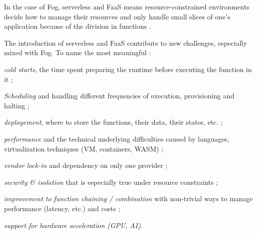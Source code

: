 \documentclass[11pt]{sdm}
\begin{document}
In the case of Fog, serverless and \gls{FaaS} means resource-constrained environments decide how to manage their resources and only handle small slices of one's application because of the division in functions \cite{bermbach_auctionwhisk_2021}.

The introduction of serverless and \gls{FaaS} contribute to new challenges, especially mixed with Fog. To name the most meaningful \cite{kjorveziroski_iot_2021}:
\begin{enumerate*}
	\item \emph{cold starts}, the time spent preparing the runtime before executing the function in it ;
	\item \emph{Scheduling} and handling different frequencies of execution, provisioning and halting ;
	\item \emph{deployement}, where to store the functions, their data, their states, etc. ;
	\item \emph{performance} and the technical underlying difficulties caused by languages, virtualization techniques (\gls{VM}, containers, WASM) ;
	\item \emph{vendor lock-in} and dependency on only one provider ;
	\item \emph{security \& isolation} that is especially true under resource constraints \cite{maurice_hello_2017} ;
	\item \emph{improvement to function chaining / combination} with non-trivial ways to manage performance (latency, etc.) and costs \cite{elgamal_costless_2018} ;
	\item \emph{support for hardware acceleration (GPU, AI)}.
\end{enumerate*}



%
\end{document}
